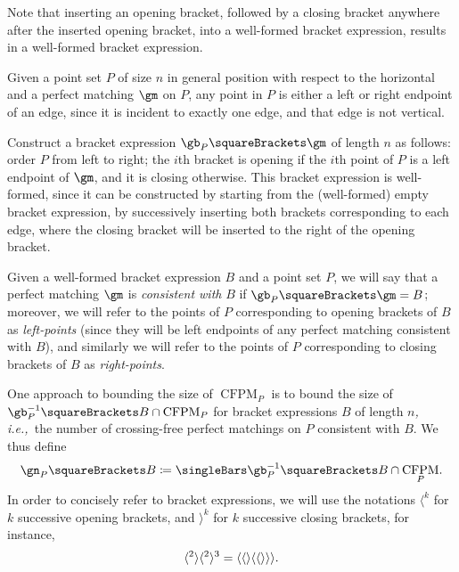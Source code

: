 \documentclass[10pt, a4paper, twoside]{basestyle}
\newcommand{\idest}{\emph{, i.e.,\ }}
\DeclareMathOperator{\CFPM}{CFPM}
\begin{document}
Note that inserting an opening bracket, followed by a closing bracket anywhere after the
inserted opening bracket, into a well-formed bracket expression, results in a well-formed bracket
expression.

Given a point set $P$  of size $n$ in general position with respect to the horizontal and a perfect
matching $\gm$ on $P$, any point in $P$ is either a left or right endpoint of an edge, since it
is incident to exactly one edge, and that edge is not vertical.

Construct a bracket expression $\gb_P\of\gm$ of length $n$ as follows: order $P$ from left to right;
the $i$th bracket is opening if the $i$th point of $P$ is a left endpoint of $\gm$, and it is
closing otherwise.
This bracket expression is well-formed, since it can be constructed by starting from the
(well-formed) empty bracket expression, by successively inserting both brackets corresponding to
each edge, where the closing bracket will be inserted to the right of the opening bracket.

Given a well-formed bracket expression $B$ and a point set $P$, we will say that a perfect matching
$\gm$ is \emph{consistent with} $B$ if $\gb_P\of\gm = B$; moreover, we will refer to the points of
$P$ corresponding to opening brackets of $B$ as \emph{left-points} (since they will be left endpoints
of any perfect matching consistent with $B$), and similarly we will refer to the points of $P$
corresponding to closing brackets of $B$ as \emph{right-points}.

One approach to bounding the size of $\CFPM_P$ is to bound the size of
$\gb_P^{-1}\of{B}\Intersection \CFPM_P$ for bracket expressions $B$ of length $n$\idest the
number of crossing-free perfect matchings on $P$ consistent with $B$. We thus define
\[\gn_P\of B \DefineAs \Cardinality{\gb_P^{-1}\of{B}\Intersection \CFPM_P}\text.\]
In order to concisely refer to bracket expressions, we will use the notations
$\langle^k$ for $k$ successive opening brackets, and $\rangle^k$ for $k$ successive
closing brackets, for instance,\[
\langle^2\rangle\langle^2\rangle^3 = \langle\langle\rangle\langle\langle\rangle\rangle\rangle
\text.\]
\end{document}
